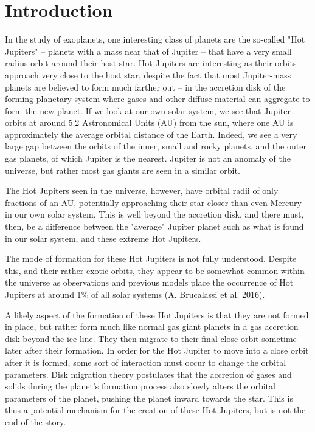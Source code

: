 \documentclass[12pt]{article}
\begin{document}
\clearpage

\section{Introduction}

In the study of exoplanets, one interesting class of planets are the so-called "Hot Jupiters" -- planets with a mass near that of Jupiter -- that have a 
very small radius orbit around their host star. 
Hot Jupiters are interesting as their orbits approach very close to the host star,
despite the fact that most Jupiter-mass planets are believed to form much farther
out -- in the accretion disk of the forming planetary system where gases 
and other diffuse material can aggregate to form the new planet. If we look at our own
solar system, we see that Jupiter orbits at around 5.2 Astronomical Units (AU) from the
sun, where one AU is approximately the average orbital distance of the Earth. Indeed,
we see a very large gap between the orbits of the inner, small and rocky planets, and
the outer gas planets, of which Jupiter is the nearest. Jupiter is not an anomaly of
the universe, but rather most gas giants are seen in a similar orbit. 

The Hot Jupiters seen in the universe, however, have orbital 
radii of only fractions of an AU, potentially 
approaching their star closer than even Mercury in our own solar system.
This is well beyond the accretion disk, and there must, then, be a difference between
the "average" Jupiter planet such as what is found in our solar system, and these
extreme Hot Jupiters.

The mode of formation for these Hot Jupiters is not fully understood.
Despite this, and their rather exotic orbits, 
they appear to be somewhat common within the universe as observations and previous models place the occurrence of Hot Jupiters at around 1\% of all solar systems (A. Brucalassi et al. 2016).  

A likely aspect of the formation of these Hot Jupiters is that they are not formed in place, but rather form much like normal gas giant planets 
in a gas accretion disk beyond the ice line. They then migrate to their final close orbit sometime later after their formation. 
In order for the Hot Jupiter to move into a close orbit after it is formed, some sort of interaction must occur to change the orbital parameters. 
Disk migration theory postulates that the accretion of gases and 
solids during the planet's formation process also slowly alters the orbital 
parameters of the planet,
pushing the planet inward towards the star.
This is thus a potential mechanism for the creation of these Hot Jupiters, but is not the end of the story.
\end{document}
